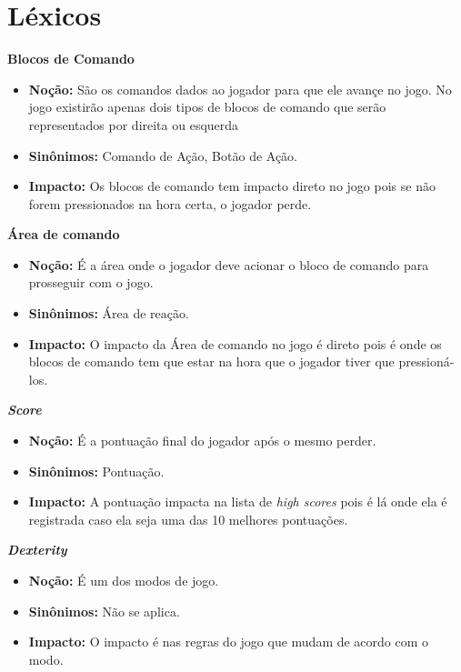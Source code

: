 \section{Léxicos}

\hypertarget{blocoDeComando}{\textbf{Blocos de Comando}}
\begin{itemize}
\item\textbf{Noção:} São os comandos dados ao jogador para que ele avançe no jogo. No jogo existirão apenas dois tipos de blocos de comando que serão representados por direita ou esquerda
\item\textbf{Sinônimos:} Comando de Ação, Botão de Ação.
\item\textbf{Impacto:} Os blocos de comando tem impacto direto no jogo pois se não forem pressionados na hora certa, o jogador perde.
\end{itemize}

\hypertarget{areaDeComando}{\textbf{Área de comando}}
\begin{itemize}
\item\textbf{Noção:} É a área onde o jogador deve acionar o bloco de comando para prosseguir com o jogo.
\item\textbf{Sinônimos:} Área de reação.
\item\textbf{Impacto:} O impacto da Área de comando no jogo é direto pois é onde os blocos de comando tem que estar na hora que o jogador tiver que pressioná-los.
\end{itemize}

\hypertarget{score}{\textbf{\textit{Score}}}
\begin{itemize}
\item\textbf{Noção:} É a pontuação final do jogador após o mesmo perder.
\item\textbf{Sinônimos:} Pontuação.
\item\textbf{Impacto:} A pontuação impacta na lista de \textit{high scores} pois é lá onde ela é registrada caso ela seja uma das 10 melhores pontuações.
\end{itemize}

\hypertarget{dexterity}{\textbf{\textit{Dexterity}}}
\begin{itemize}
\item\textbf{Noção:} É um dos modos de jogo.
\item\textbf{Sinônimos:} Não se aplica.
\item\textbf{Impacto:} O impacto é nas regras do jogo que mudam de acordo com o modo.
\end{itemize}

